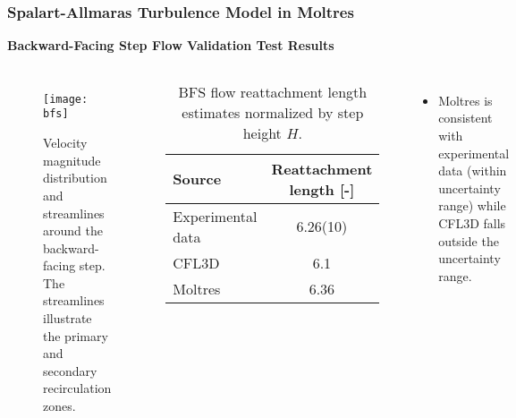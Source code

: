 \begin{frame}
  \frametitle{Spalart-Allmaras Turbulence Model in Moltres}
  \textbf{Backward-Facing Step Flow Validation Test Results}
  \begin{columns}
    \column{5.5cm}
    \begin{figure}[htb!]
      \centering
      \texttt{[image: bfs]}
      \caption{Velocity magnitude distribution and streamlines around the backward-facing step. The
      streamlines illustrate the primary and secondary recirculation zones.}
      \label{fig:bfs}
    \end{figure}
    \column{5.5cm}
    \begin{table}[htb]
      \centering
      \scriptsize
      \caption{BFS flow reattachment length estimates normalized by step height $H$.}
      \begin{tabular}{l S[table-format=1.2(2)]}
        \toprule
        Source & {Reattachment length [-]} \\
        \midrule
        Experimental data & 6.26(10) \\
        CFL3D & 6.1 \\
        Moltres & 6.36 \\
        \bottomrule
      \end{tabular}
      \label{table:bfs-reattach}
    \end{table}
    \begin{itemize}
      \item Moltres is consistent with experimental data (within uncertainty range) while CFL3D
        falls outside the uncertainty range.
    \end{itemize}
  \end{columns}
\end{frame}

